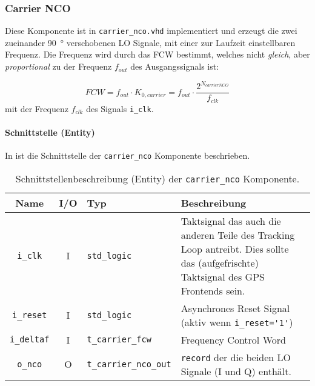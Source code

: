 \subsubsection{Carrier NCO}
Diese Komponente ist in  \lstinline$carrier_nco.vhd$ implementiert und erzeugt die zwei zueinander \SI{90}{\degree} verschobenen LO Signale, mit einer zur Laufzeit einstellbaren Frequenz. Die Frequenz wird durch das \gls{FCW} bestimmt, welches nicht \emph{gleich}, aber \emph{proportional} zu der Frequenz $f_{out}$ des Ausgangssignals ist:

\begin{equation}
    FCW=f_{out}\cdot K_{0,carrier} =f_{out}\cdot  \frac{2^{N_{carrierNCO}}}{f_{clk}}
\end{equation}
mit der Frequenz $f_{clk}$ des Signals \lstinline$i_clk$. 


\paragraph{Schnittstelle (Entity)}
In  ist die Schnittstelle der \lstinline$carrier_nco$ Komponente beschrieben.

\begin{table}[htbp]
    \ttabbox
    {
        \caption[Carrier NCO Schnittstelle]{Schnittstellenbeschreibung (Entity) der \lstinline$carrier_nco$ Komponente.}
        \label{TabCarrierNCO_Entity}
    }
    {
    \begin{tabular}{c c  p{2cm} p{6cm}}
        \toprule
        Name                    & I/O  & Typ                               & Beschreibung \\
        \midrule
        \lstinline$i_clk$       & I         & \lstinline$std_logic$             & Taktsignal das auch die anderen Teile des Tracking Loop antreibt. Dies sollte das (aufgefrischte) Taktsignal des GPS Frontends sein.\\
        \lstinline$i_reset$     & I         & \lstinline$std_logic$             & Asynchrones Reset Signal (aktiv wenn \lstinline$i_reset='1'$) \\
        \lstinline$i_deltaf$    & I         & \lstinline$t_carrier_fcw$             & Frequency Control Word \\
        \lstinline$o_nco$       & O         & \lstinline$t_carrier_nco_out$ & \lstinline$record$ der die beiden LO Signale (I und Q) enthält. \\
        \bottomrule
    \end{tabular}
}
\end{table}

